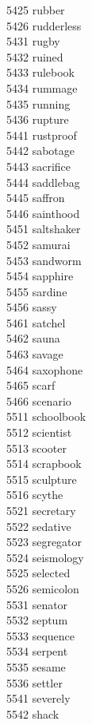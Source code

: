 5425 rubber \\
5426 rudderless \\
5431 rugby \\
5432 ruined \\
5433 rulebook \\
5434 rummage \\
5435 running \\
5436 rupture \\
5441 rustproof \\
5442 sabotage \\
5443 sacrifice \\
5444 saddlebag \\
5445 saffron \\
5446 sainthood \\
5451 saltshaker \\
5452 samurai \\
5453 sandworm \\
5454 sapphire \\
5455 sardine \\
5456 sassy \\
5461 satchel \\
5462 sauna \\
5463 savage \\
5464 saxophone \\
5465 scarf \\
5466 scenario \\
5511 schoolbook \\
5512 scientist \\
5513 scooter \\
5514 scrapbook \\
5515 sculpture \\
5516 scythe \\
5521 secretary \\
5522 sedative \\
5523 segregator \\
5524 seismology \\
5525 selected \\
5526 semicolon \\
5531 senator \\
5532 septum \\
5533 sequence \\
5534 serpent \\
5535 sesame \\
5536 settler \\
5541 severely \\
5542 shack \\
